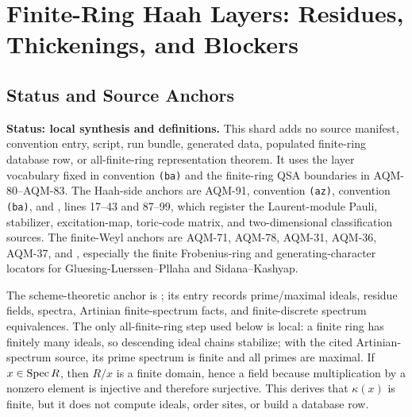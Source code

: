 
\section{Finite-Ring Haah Layers: Residues, Thickenings, and Blockers}
\label{sec:finite-ring-haah-layers}

\subsection{Status and Source Anchors}

\textbf{Status: local synthesis and definitions.}  This shard adds no source
manifest, convention entry, script, run bundle, generated data, populated
finite-ring database row, or all-finite-ring representation theorem.  It
uses the layer vocabulary fixed in convention \texttt{(ba)} and the
finite-ring QSA boundaries in AQM-80--AQM-83.  The Haah-side anchors are
AQM-91, convention \texttt{(az)}, convention \texttt{(ba)}, and
, lines 17--43 and
87--99, which register the Laurent-module Pauli, stabilizer, excitation-map,
toric-code matrix, and two-dimensional classification sources.  The
finite-Weyl anchors are AQM-71, AQM-78, AQM-31, AQM-36, AQM-37, and
, especially the finite
Frobenius-ring and generating-character locators for
Gluesing-Luerssen--Pllaha and Sidana--Kashyap.

The scheme-theoretic anchor is
; its
 entry records
prime/maximal ideals, residue fields, spectra, Artinian finite-spectrum
facts, and finite-discrete spectrum equivalences.  The only all-finite-ring
step used below is local: a finite ring has finitely many ideals, so
descending ideal chains stabilize; with the cited Artinian-spectrum source,
its prime spectrum is finite and all primes are maximal.  If \(x\in\operatorname{Spec} R\),
then \(R/x\) is a finite domain, hence a field because multiplication by a
nonzero element is injective and therefore surjective.  This derives that
\(\kappa(x)\) is finite, but it does not compute ideals, order sites, or build
a database row.

